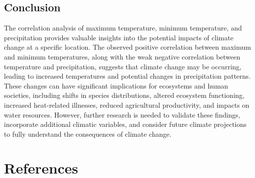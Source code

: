 \documentclass{article}
\begin{document}
\subsection{Conclusion}

The correlation analysis of maximum temperature, minimum temperature, and precipitation provides valuable insights into the potential impacts of climate change at a specific location. The observed positive correlation between maximum and minimum temperatures, along with the weak negative correlation between temperature and precipitation, suggests that climate change may be occurring, leading to increased temperatures and potential changes in precipitation patterns. These changes can have significant implications for ecosystems and human societies, including shifts in species distributions, altered ecosystem functioning, increased heat-related illnesses, reduced agricultural productivity, and impacts on water resources. However, further research is needed to validate these findings, incorporate additional climatic variables, and consider future climate projections to fully understand the consequences of climate change.

\section{References}
\end{document}
